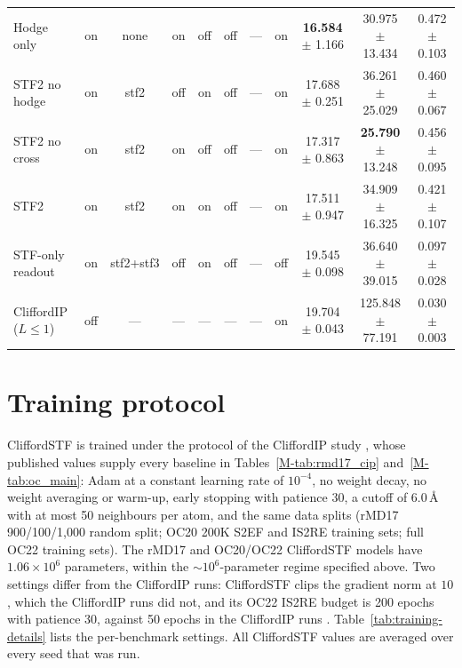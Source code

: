 \begin{table}[!htbp]
{\begin{tabular}{l cccccc c ccc}
Hodge only & on & none & on & off & off & --- & on & \textbf{16.584} $\pm$ 1.166 & 30.975 $\pm$ 13.434 & 0.472 $\pm$ 0.103 \\
STF2 no hodge & on & stf2 & off & on & off & --- & on & 17.688 $\pm$ 0.251 & 36.261 $\pm$ 25.029 & 0.460 $\pm$ 0.067 \\
STF2 no cross & on & stf2 & on & off & off & --- & on & 17.317 $\pm$ 0.863 & \textbf{25.790} $\pm$ 13.248 & 0.456 $\pm$ 0.095 \\
STF2 & on & stf2 & on & on & off & --- & on & 17.511 $\pm$ 0.947 & 34.909 $\pm$ 16.325 & 0.421 $\pm$ 0.107 \\
\midrule
STF-only readout & on & stf2+stf3 & off & on & off & --- & off & 19.545 $\pm$ 0.098 & 36.640 $\pm$ 39.015 & 0.097 $\pm$ 0.028 \\
CliffordIP ($L{\leq}1$) & off & --- & --- & --- & --- & --- & on & 19.704 $\pm$ 0.043 & 125.848 $\pm$ 77.191 & 0.030 $\pm$ 0.003 \\
\bottomrule
\end{tabular}}
\end{table}

\section{Training protocol}\label{supp:protocol}

CliffordSTF is trained under the protocol of the CliffordIP study \cite{polat2026cliffordip}, whose published values supply every baseline in Tables~\ref{M-tab:rmd17_cip} and~\ref{M-tab:oc_main}: Adam \citep{kingma2015adam} at a constant learning rate of $10^{-4}$, no weight decay, no weight averaging or warm-up, early stopping with patience 30, a cutoff of $6.0$\,\AA{} with at most 50 neighbours per atom, and the same data splits (rMD17 900/100/1{,}000 random split; OC20 200K S2EF and IS2RE training sets; full OC22 training sets). The rMD17 and OC20/OC22 CliffordSTF models have $1.06\times10^{6}$ parameters, within the $\sim\!10^{6}$-parameter regime specified above. Two settings differ from the CliffordIP runs: CliffordSTF clips the gradient norm at $10$, which the CliffordIP runs did not, and its OC22 IS2RE budget is 200 epochs with patience 30, against 50 epochs in the CliffordIP runs \citep{polat2026cliffordip}. Table~\ref{tab:training-details} lists the per-benchmark settings. All CliffordSTF values are averaged over every seed that was run.

